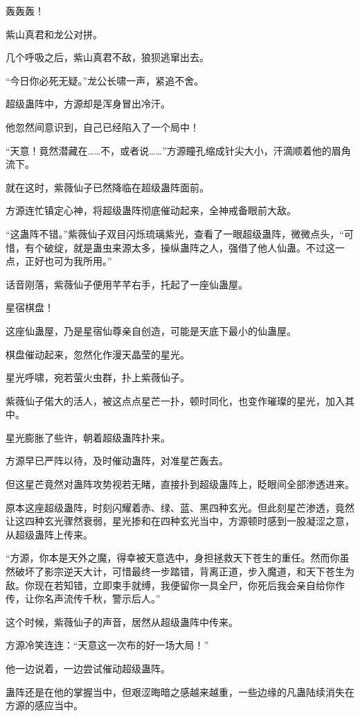 \begin{this_body}
轰轰轰！

紫山真君和龙公对拼。

几个呼吸之后，紫山真君不敌，狼狈逃窜出去。

“今日你必死无疑。”龙公长啸一声，紧追不舍。

超级蛊阵中，方源却是浑身冒出冷汗。

他忽然间意识到，自己已经陷入了一个局中！

“天意！竟然潜藏在……不，或者说……”方源瞳孔缩成针尖大小，汗滴顺着他的眉角流下。

就在这时，紫薇仙子已然降临在超级蛊阵面前。

方源连忙镇定心神，将超级蛊阵彻底催动起来，全神戒备眼前大敌。

“这蛊阵不错。”紫薇仙子双目闪烁琉璃紫光，查看了一眼超级蛊阵，微微点头，“可惜，有个破绽，就是蛊虫来源太多，操纵蛊阵之人，强借了他人仙蛊。不过这一点，正好也可为我所用。”

话音刚落，紫薇仙子便用芊芊右手，托起了一座仙蛊屋。

星宿棋盘！

这座仙蛊屋，乃是星宿仙尊亲自创造，可能是天底下最小的仙蛊屋。

棋盘催动起来，忽然化作漫天晶莹的星光。

星光呼啸，宛若萤火虫群，扑上紫薇仙子。

紫薇仙子偌大的活人，被这点点星芒一扑，顿时同化，也变作璀璨的星光，加入其中。

星光膨胀了些许，朝着超级蛊阵扑来。

方源早已严阵以待，及时催动蛊阵，对准星芒轰去。

但这星芒竟然对蛊阵攻势视若无睹，直接扑到超级蛊阵上，眨眼间全部渗透进来。

原本这座超级蛊阵，时刻闪耀着赤、绿、蓝、黑四种玄光。但此刻星芒渗透，竟然让这四种玄光骤然衰弱，星光掺和在四种玄光当中，方源顿时感到一股凝涩之意，从超级蛊阵上传来。

“方源，你本是天外之魔，得幸被天意选中，身担拯救天下苍生的重任。然而你虽然破坏了影宗逆天大计，可惜最终一步踏错，背离正道，步入魔道，和天下苍生为敌。你现在若知错，立即束手就缚，我便留你一具全尸，你死后我会亲自给你作传，让你名声流传千秋，警示后人。”

这个时候，紫薇仙子的声音，居然从超级蛊阵中传来。

方源冷笑连连：“天意这一次布的好一场大局！”

他一边说着，一边尝试催动超级蛊阵。

蛊阵还是在他的掌握当中，但艰涩晦暗之感越来越重，一些边缘的凡蛊陆续消失在方源的感应当中。


\end{this_body}
